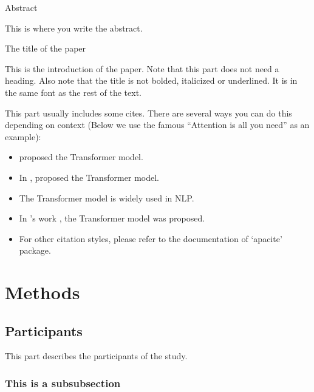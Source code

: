 \documentclass[12pt]{article}
\providecommand{\tightlist}{\setlength{\itemsep}{0pt}\setlength{\parskip}{0pt}}
\begin{document}
\begin{doublespace}

\begin{center}
     Abstract
\end{center}

{\noindent
This is where you write the abstract.
}
\newpage

\begin{center}
    The title of the paper
\end{center}

This is the introduction of the paper. Note that this part does not need a heading. Also note that the title is not bolded, italicized or underlined. It is in the same font as the rest of the text.

This part usually includes some cites. There are several ways you can do this depending on context (Below we use the famous ``Attention is all you need'' as an example):

\begin{itemize}\tightlist
    \item {} proposed the Transformer model.
    \item In , \citeauthor{vaswani2017attention} proposed the Transformer model.
    \item The Transformer model \cite{vaswani2017attention} is widely used in NLP.
    \item In \citeauthor{vaswani2017attention}'s work \citeyear{vaswani2017attention}, the Transformer model was proposed.
    \item For other citation styles, please refer to the documentation of `apacite' package.
\end{itemize}

\section{Methods}

\subsection{Participants}

This part describes the participants of the study.

\subsubsection{This is a subsubsection}


\end{doublespace}
\end{document}
